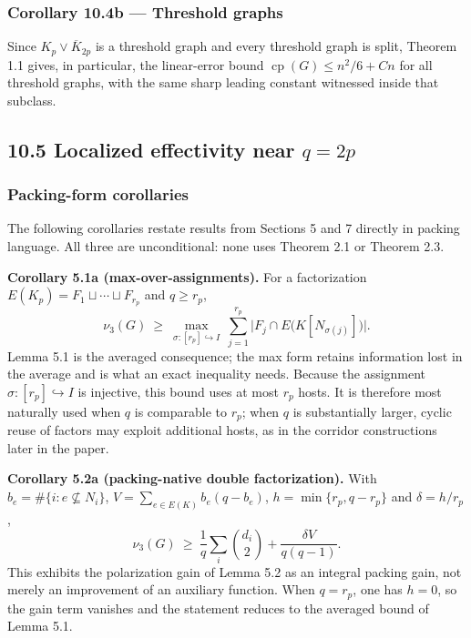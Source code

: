 \documentclass[english,11pt,a4paper]{article}
\newcounter{none}
\begin{document}
\subsubsection{Corollary 10.4b --- Threshold
graphs}\label{corollary-10.4b-threshold-graphs}

Since \(K_p\vee\overline K_{2p}\) is a threshold graph and every
threshold graph is split, Theorem 1.1 gives, in particular, the
linear-error bound \(\operatorname{cp}(G)\le n^2/6+Cn\) for all
threshold graphs, with the same sharp leading constant witnessed inside
that subclass.

\subsection{\texorpdfstring{10.5 Localized effectivity near
\(q=2p\)}{10.5 Localized effectivity near q=2p}}\label{localized-effectivity-near-q2p}

\subsubsection{Packing-form corollaries}\label{packing-form-corollaries}

The following corollaries restate results from Sections 5 and 7 directly
in packing language. All three are unconditional: none uses Theorem 2.1
or Theorem 2.3.

\textbf{Corollary 5.1a (max-over-assignments).} For a factorization
\(E(K_p)=F_1\sqcup\cdots\sqcup F_{r_p}\) and \(q\ge r_p\), \[
\nu_3(G)\ \ge\ \max_{\sigma:[r_p]\hookrightarrow I}\ \sum_{j=1}^{r_p}\big|F_j\cap E\big(K[N_{\sigma(j)}]\big)\big|.
\] Lemma 5.1 is the averaged consequence; the max form retains
information lost in the average and is what an exact inequality needs.
Because the assignment \(\sigma:[r_p]\hookrightarrow I\) is injective,
this bound uses at most \(r_p\) hosts. It is therefore most naturally
used when \(q\) is comparable to \(r_p\); when \(q\) is substantially
larger, cyclic reuse of factors may exploit additional hosts, as in the
corridor constructions later in the paper.

\textbf{Corollary 5.2a (packing-native double factorization).} With
\(b_e=\#\{i:e\not\subseteq N_i\}\), \(V=\sum_{e\in E(K)} b_e(q-b_e)\),
\(h=\min\{r_p,q-r_p\}\) and \(\delta=h/r_p\), \[
\nu_3(G)\ \ge\ \frac1q\sum_i\binom{d_i}{2}+\frac{\delta V}{q(q-1)}.
\] This exhibits the polarization gain of Lemma 5.2 as an integral
packing gain, not merely an improvement of an auxiliary function. When
\(q=r_p\), one has \(h=0\), so the gain term vanishes and the statement
reduces to the averaged bound of Lemma 5.1.
\end{document}
